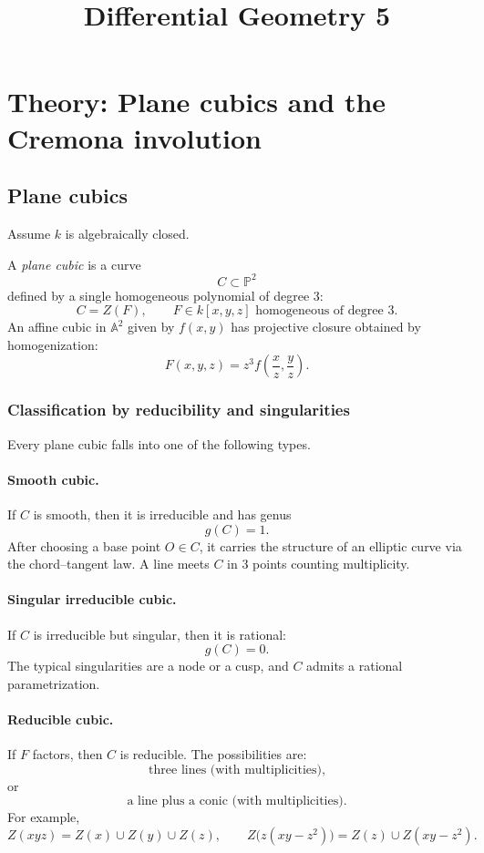 \documentclass[12pt,a4paper]{article}
\title{Differential Geometry 5}
\author{}
\date{}
\theoremstyle{plain}
\theoremstyle{definition}      %
\begin{document}
	\maketitle


\section*{Theory: Plane cubics and the Cremona involution}

\subsection*{Plane cubics}

Assume $k$ is algebraically closed.

A \emph{plane cubic} is a curve
\[
C\subset \mathbb P^2
\]
defined by a single homogeneous polynomial of degree $3$:
\[
C=Z(F),
\qquad
F\in k[x,y,z] \text{ homogeneous of degree }3.
\]
An affine cubic in $\mathbb A^2$ given by $f(x,y)$ has projective closure obtained by homogenization:
\[
F(x,y,z)=z^3 f\!\left(\frac{x}{z},\frac{y}{z}\right).
\]

\subsubsection*{Classification by reducibility and singularities}

Every plane cubic falls into one of the following types.

\paragraph{Smooth cubic.}
If $C$ is smooth, then it is irreducible and has genus
\[
g(C)=1.
\]
After choosing a base point $O\in C$, it carries the structure of an elliptic curve via the chord--tangent law.
A line meets $C$ in $3$ points counting multiplicity.

\paragraph{Singular irreducible cubic.}
If $C$ is irreducible but singular, then it is rational:
\[
g(C)=0.
\]
The typical singularities are a node or a cusp, and $C$ admits a rational parametrization.

\paragraph{Reducible cubic.}
If $F$ factors, then $C$ is reducible.
The possibilities are:
\[
\text{three lines (with multiplicities),}
\]
or
\[
\text{a line plus a conic (with multiplicities).}
\]
For example,
\[
Z(xyz)=Z(x)\cup Z(y)\cup Z(z),
\qquad
Z\bigl(z(xy-z^2)\bigr)=Z(z)\cup Z(xy-z^2).
\]
\end{document}
